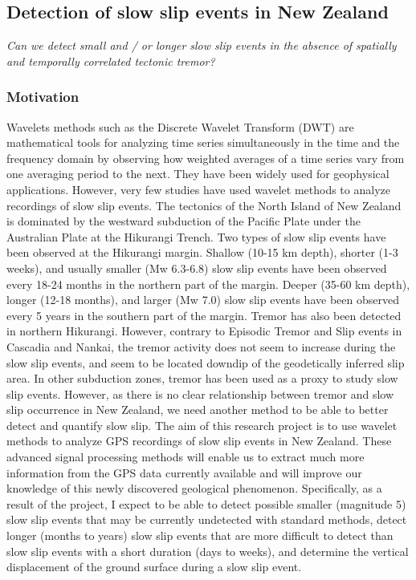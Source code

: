 \documentclass[letterpaper, 12pt]{article}
\begin{document}
\subsection{Detection of slow slip events in New Zealand}

\textit{Can we detect small and / or longer slow slip events in the absence of spatially and temporally correlated tectonic tremor?}

\subsubsection*{Motivation}

Wavelets methods such as the Discrete Wavelet Transform (DWT) are mathematical tools for analyzing time series simultaneously in the time and the frequency domain by observing how weighted averages of a time series vary from one averaging period to the next. They have been widely used for geophysical applications. However, very few studies have used wavelet methods to analyze recordings of slow slip events. The tectonics of the North Island of New Zealand is dominated by the westward subduction of the Pacific Plate under the Australian Plate at the Hikurangi Trench. Two types of slow slip events
have been observed at the Hikurangi margin. Shallow (10-15 km depth), shorter (1-3 weeks), and usually smaller (Mw 6.3-6.8) slow slip events have been observed every 18-24 months in the northern part of the margin. Deeper (35-60 km depth), longer (12-18 months), and larger (Mw 7.0) slow slip events have been observed every 5 years in the southern part of the margin. Tremor has also been detected in northern Hikurangi. However, contrary to Episodic Tremor and Slip events in Cascadia and Nankai, the tremor activity does not seem to increase during the slow slip events, and seem to be located downdip of the geodetically inferred slip area. In other subduction zones, tremor has been used as a proxy to study slow slip events. However, as there is no clear relationship between tremor and slow slip occurrence in
New Zealand, we need another method to be able to better detect and quantify slow slip. The aim of this research project is to use wavelet methods to analyze GPS recordings of slow slip events in New Zealand. These advanced signal processing methods will enable us to extract much more information from the GPS data currently available and will improve our knowledge of this newly discovered geological phenomenon. Specifically, as a result of the project, I expect to be able to detect possible smaller (magnitude 5) slow slip events that may be currently undetected with standard methods, detect longer (months to years) slow slip events that are more difficult to detect than slow slip events with a short duration (days to weeks), and determine the vertical displacement of the ground surface during a slow slip event.
\end{document}
